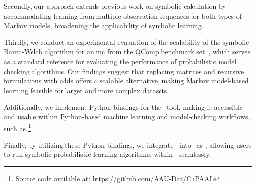 Secondly, our approach extends previous work on symbolic calculation by accommodating learning from multiple observation sequences for both types of Markov models, broadening the applicability of symbolic learning.

Thirdly, we conduct an experimental evaluation of the scalability of the symbolic Baum-Welch algorithm for an \gls{mc} from the QComp benchmark set~\cite{HartmannsKPQR19}, which serves as a standard reference for evaluating the performance of probabilistic model checking algorithms.
Our findings suggest that replacing matrices and recursive formulations with \glspl{add} offers a scalable alternative, making Markov model-based learning feasible for larger and more complex datasets.

Additionally, we implement Python bindings for the \Cupaal\ tool, making it accessible and usable within Python-based machine learning and model-checking workflows, such as \Jajapy\footnote{Source code available at: \url{https://github.com/AAU-Dat/CuPAAL}}.

Finally, by utilizing these Python bindings, we integrate \Cupaal\ into \Jajapy\ as \JajapyTwo, allowing users to run symbolic probabilistic learning algorithms within \Jajapy\ seamlessly.
